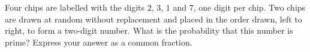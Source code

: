 Four chips are labelled with the digits $2$, $3$, $1$ and $7$, one digit per chip. Two chips are drawn at random without replacement and placed in the order drawn, left to right, to form a two-digit number. What is the probability that this number is prime? Express your answer as a common fraction.
